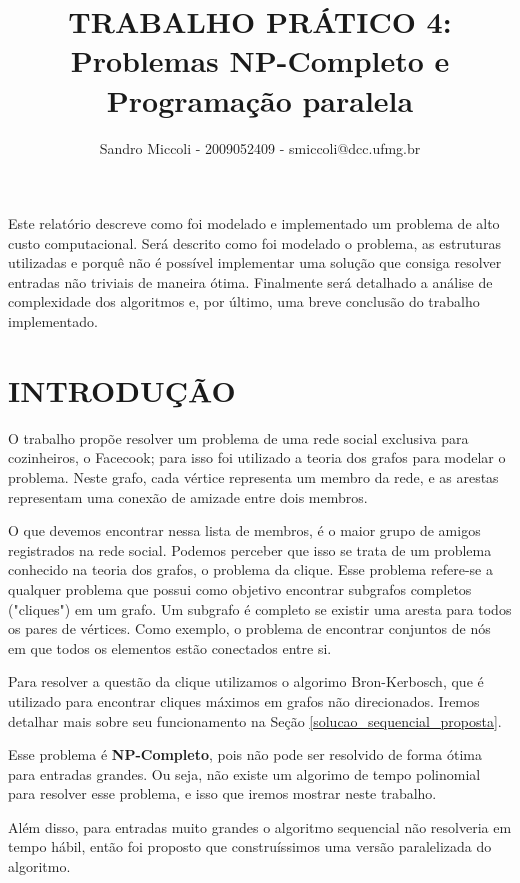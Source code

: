 \documentclass[12pt]{article}
\title{TRABALHO PRÁTICO 4: \\ Problemas NP-Completo e Programação paralela}
\author{Sandro Miccoli - 2009052409 - smiccoli@dcc.ufmg.br}
\begin{document}
\maketitle

\begin{resumo}
Este relatório descreve como foi modelado e implementado um problema de alto custo computacional. Será descrito como foi modelado o problema, as estruturas utilizadas e porquê não é possível implementar uma solução que consiga resolver entradas não triviais de maneira ótima. Finalmente será detalhado a análise de complexidade dos algoritmos e, por último, uma breve conclusão do trabalho implementado.
\end{resumo}

\section{INTRODUÇÃO}

    O trabalho propõe resolver um problema de uma rede social exclusiva para cozinheiros, o Facecook; para isso foi utilizado a teoria dos grafos para modelar o problema. Neste grafo, cada vértice representa um membro da rede, e as arestas representam uma conexão de amizade entre dois membros.

    O que devemos encontrar nessa lista de membros, é o maior grupo de amigos registrados na rede social. Podemos perceber que isso se trata de um problema conhecido na teoria dos grafos, o problema da clique. Esse problema refere-se a qualquer problema que possui como objetivo encontrar subgrafos completos ("cliques") em um grafo. Um subgrafo é completo se existir uma aresta para todos os pares de vértices. Como exemplo, o problema de encontrar conjuntos de nós em que todos os elementos estão conectados entre si. \cite{wikiclique}

    Para resolver a questão da clique utilizamos o algorimo Bron-Kerbosch, que é utilizado para encontrar cliques máximos em grafos não direcionados. Iremos detalhar mais sobre seu funcionamento na Seção \ref{solucao_sequencial_proposta}.

    Esse problema é \textbf{NP-Completo}, pois não pode ser resolvido de forma ótima para entradas grandes. Ou seja, não existe um algorimo de tempo polinomial para resolver esse problema, e isso que iremos mostrar neste trabalho.

    Além disso, para entradas muito grandes o algoritmo sequencial não resolveria em tempo hábil, então foi proposto que construíssimos uma versão paralelizada do algoritmo.
\end{document}

